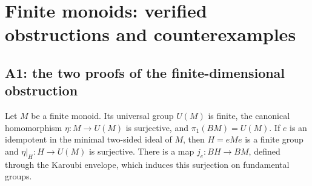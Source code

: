 \section{Finite monoids: verified obstructions and counterexamples}\label{sec:A}

\subsection{A1: the two proofs of the finite-dimensional obstruction}

\begin{lemma}\label{A:minimal-group}
Let $M$ be a finite monoid. Its universal group $U(M)$ is finite, the canonical
homomorphism $\eta:M\to U(M)$ is surjective, and $\pi_1(BM)=U(M)$.
If $e$ is an idempotent in the minimal two-sided ideal of $M$, then $H=eMe$ is a
finite group and $\eta|_H:H\to U(M)$ is surjective. There is a map
$j_e:BH\to BM$, defined through the Karoubi envelope, which induces this
surjection on fundamental groups.
\end{lemma}
